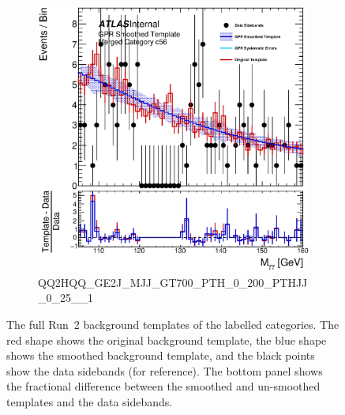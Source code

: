 \begin{figure}
\begin{center}
\begin{subfigure}[T]{0.49\linewidth}
	\centering
	\includegraphics[width=\linewidth]{figures/background/gpr/coupCatTemplates/GPR_Smoothed_Plot_hmgg_c56.eps}
	\caption{\tiny{QQ2HQQ\_GE2J\_MJJ\_GT700\_PTH\_0\_200\_PTHJJ\_0\_25\_\_1}}
\end{subfigure}
\caption{The full Run~2 background templates of the labelled categories. The red shape shows the original background template, the blue shape shows the smoothed background template, and the black points show the data sidebands (for reference). The bottom panel shows the fractional difference between the smoothed and un-smoothed templates and the data sidebands. }
 \label{fig:gpr_coupcat_14}
 \end{center}
\end{figure}

